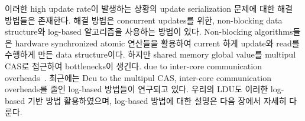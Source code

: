 







\fi


\ifkor
이러한 high update rate이 발생하는 상황의 update serialization 문제에 대한 해결 방법들은 존재한다. 
해결 방법은 concurrent updates를 위한, non-blocking data structure와
log-based 알고리즘을 사용하는 방법이 있다.
Non-blocking algorithms들은 hardware synchronized atomic 연산들을 활용하여 current 하게
update와 read를 수행하게 만든 data structure이다.
하지만 shared memory global value를 multipul CAS로 접근하여 bottlenecks이 생긴다.
due to inter-core communication overheads~\cite{SilasBoydWickizerPth}.
최근에는 Deu to the multipul CAS, inter-core communication overheads를 줄인 log-based
방법들이 연구되고 있다.
우리의 LDU도 이러한 log-based 기반 방법 활용하였으며, log-based 방법에 대한 설명은 다음 장에서 자세히 다룬다.
\else










